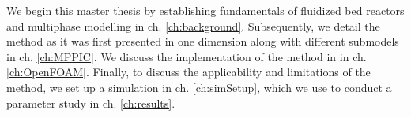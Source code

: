 We begin this master thesis by establishing fundamentals of fluidized bed reactors and multiphase modelling in ch. \ref{ch:background}. Subsequently, we detail the \MP method as it was first presented in one dimension along with different submodels in ch. \ref{ch:MPPIC}. We discuss the implementation of the \MP method in \OF in ch. \ref{ch:OpenFOAM}.
Finally, to discuss the applicability and limitations of the \MP method, we set up a simulation in ch. \ref{ch:simSetup}, which we use to conduct a parameter study in ch. \ref{ch:results}.







